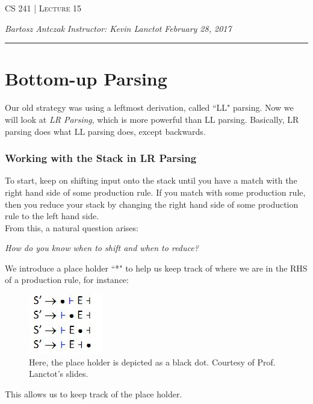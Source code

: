 \documentclass{report}
\newcommand{\lectureNum}{15}
\newcommand{\curDate}{February 28, 2017}
\newcommand{\course}{CS 241}
\newcommand{\instructor}{Kevin Lanctot}
\begin{document}
\begin{center}
\begin{Large}
\textsc{\course{} | Lecture \lectureNum{}}
\end{Large}
\end{center} 
\noindent \textit{Bartosz Antczak} \hfill
\textit{Instructor: \instructor{}} \hfill
\textit{\curDate{}}
\rule{\textwidth}{0.4pt}
\section{Bottom-up Parsing}
Our old strategy was using a leftmost derivation, called ``LL" parsing. Now we will look at \textit{LR Parsing}, which is more powerful than LL parsing. Basically, LR parsing does what LL parsing does, except backwards.
\subsubsection{Working with the Stack in LR Parsing}
To start, keep on shifting input onto the stack until you have a match with the right hand side of some production rule. If you match with some production rule, then you reduce your stack by changing the right hand side of some production rule to the left hand side.\\
From this, a natural question arises:
\begin{center}
\textit{How do you know when to shift and when to reduce?}
\end{center}
We introduce a place holder ``*" to help us keep track of where we are in the RHS of a production rule, for instance:
\begin{figure}[ht]
\begin{center}
\includegraphics[scale=0.9]{lr1.jpg}
\end{center}
\caption{Here, the place holder is depicted as a black dot. Courtesy of Prof. Lanctot's slides.}
\end{figure}
This allows us to keep track of the place holder.
\end{document}
